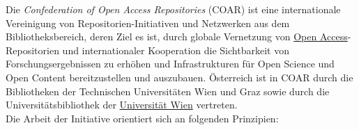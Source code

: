 \documentclass{article}
\begin{document}
    Die \emph{Confederation of Open Access Repositories} (COAR) ist
                  eine internationale Vereinigung von Repositorien-Initiativen und Netzwerken aus
                  dem Bibliotheksbereich, deren Ziel es ist, durch globale Vernetzung von \href{http://gams.uni-graz.at/o:konde.152}{Open Access}-Repositorien und
                  internationaler Kooperation die Sichtbarkeit von Forschungsergebnissen zu erhöhen
                  und Infrastrukturen für Open Science und Open Content bereitzustellen und
                  auszubauen. Österreich ist in COAR durch die Bibliotheken der Technischen
                  Universitäten Wien und Graz sowie durch die Universitätsbibliothek der \href{http://gams.uni-graz.at/o:konde.204}{Universität Wien} vertreten.\\
            
        Die Arbeit der Initiative orientiert sich an folgenden Prinzipien:\\
            
\end{document}
